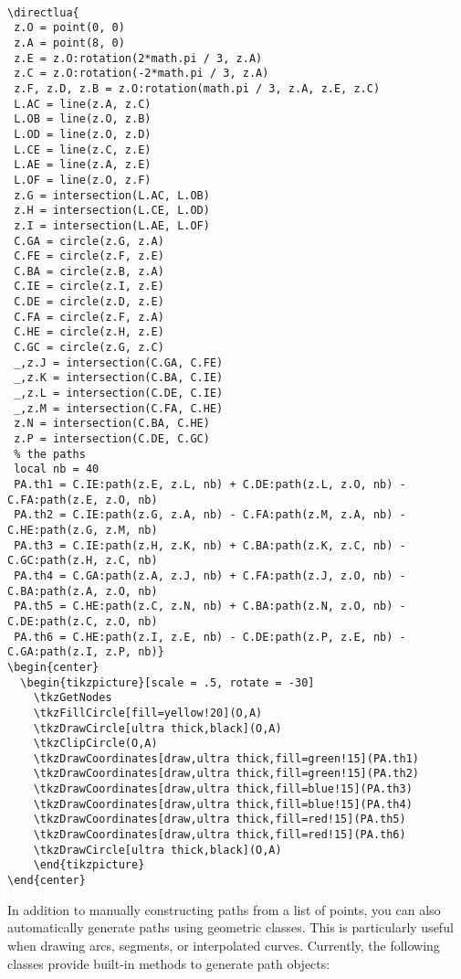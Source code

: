 \begin{verbatim}

\directlua{
 z.O = point(0, 0)
 z.A = point(8, 0)
 z.E = z.O:rotation(2*math.pi / 3, z.A)
 z.C = z.O:rotation(-2*math.pi / 3, z.A)
 z.F, z.D, z.B = z.O:rotation(math.pi / 3, z.A, z.E, z.C)
 L.AC = line(z.A, z.C)
 L.OB = line(z.O, z.B)
 L.OD = line(z.O, z.D)
 L.CE = line(z.C, z.E)
 L.AE = line(z.A, z.E)
 L.OF = line(z.O, z.F)
 z.G = intersection(L.AC, L.OB)
 z.H = intersection(L.CE, L.OD)
 z.I = intersection(L.AE, L.OF)
 C.GA = circle(z.G, z.A)
 C.FE = circle(z.F, z.E)
 C.BA = circle(z.B, z.A)
 C.IE = circle(z.I, z.E)
 C.DE = circle(z.D, z.E)
 C.FA = circle(z.F, z.A)
 C.HE = circle(z.H, z.E)
 C.GC = circle(z.G, z.C)
 _,z.J = intersection(C.GA, C.FE)
 _,z.K = intersection(C.BA, C.IE)
 _,z.L = intersection(C.DE, C.IE)
 _,z.M = intersection(C.FA, C.HE)
 z.N = intersection(C.BA, C.HE)
 z.P = intersection(C.DE, C.GC)
 % the paths
 local nb = 40
 PA.th1 = C.IE:path(z.E, z.L, nb) + C.DE:path(z.L, z.O, nb) - C.FA:path(z.E, z.O, nb)
 PA.th2 = C.IE:path(z.G, z.A, nb) - C.FA:path(z.M, z.A, nb) - C.HE:path(z.G, z.M, nb)
 PA.th3 = C.IE:path(z.H, z.K, nb) + C.BA:path(z.K, z.C, nb) - C.GC:path(z.H, z.C, nb)
 PA.th4 = C.GA:path(z.A, z.J, nb) + C.FA:path(z.J, z.O, nb) - C.BA:path(z.A, z.O, nb)
 PA.th5 = C.HE:path(z.C, z.N, nb) + C.BA:path(z.N, z.O, nb) - C.DE:path(z.C, z.O, nb)
 PA.th6 = C.HE:path(z.I, z.E, nb) - C.DE:path(z.P, z.E, nb) - C.GA:path(z.I, z.P, nb)}
\begin{center}
  \begin{tikzpicture}[scale = .5, rotate = -30]
    \tkzGetNodes
    \tkzFillCircle[fill=yellow!20](O,A)
    \tkzDrawCircle[ultra thick,black](O,A)
    \tkzClipCircle(O,A)
    \tkzDrawCoordinates[draw,ultra thick,fill=green!15](PA.th1)
    \tkzDrawCoordinates[draw,ultra thick,fill=green!15](PA.th2)
    \tkzDrawCoordinates[draw,ultra thick,fill=blue!15](PA.th3)
    \tkzDrawCoordinates[draw,ultra thick,fill=blue!15](PA.th4)
    \tkzDrawCoordinates[draw,ultra thick,fill=red!15](PA.th5)
    \tkzDrawCoordinates[draw,ultra thick,fill=red!15](PA.th6)
    \tkzDrawCircle[ultra thick,black](O,A)
    \end{tikzpicture}
\end{center}

\end{verbatim}

\medskip

In addition to manually constructing paths from a list of points, you can also automatically generate paths using geometric classes. This is particularly useful when drawing arcs, segments, or interpolated curves. Currently, the following classes provide built-in methods to generate path objects:

